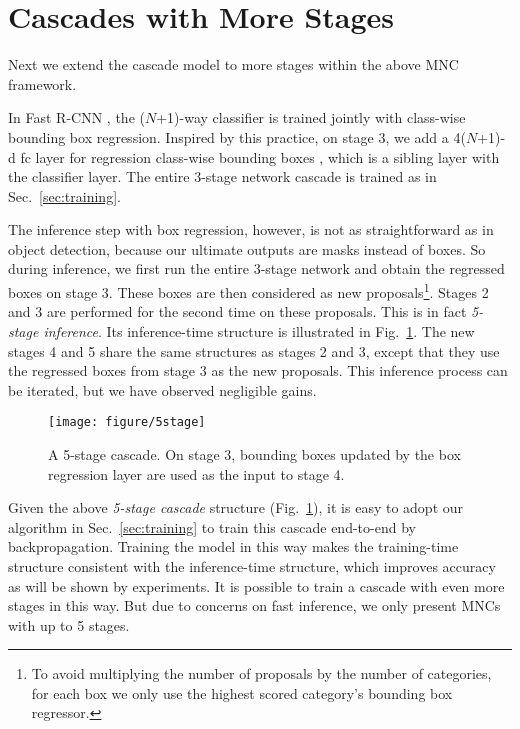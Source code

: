 \documentclass[10pt,twocolumn,letterpaper]{article}
\begin{document}
\section{Cascades with More Stages}
\label{sec:morestages}

Next we extend the cascade model to more stages within the above MNC framework.

In Fast R-CNN \cite{Girshick2015}, the ($N$+1)-way classifier is trained jointly with class-wise bounding box regression. Inspired by this practice, on stage 3, we add a 4($N$+1)-d fc layer for regression class-wise bounding boxes \cite{Girshick2015}, which is a sibling layer with the classifier layer. The entire 3-stage network cascade is trained as in Sec.~\ref{sec:training}.

The inference step with box regression, however, is not as straightforward as in object detection, because our ultimate outputs are masks instead of boxes. So during inference, we first run the entire 3-stage network and obtain the regressed boxes on stage 3. These boxes are then considered as new proposals\footnote{To avoid multiplying the number of proposals by the number of categories, for each box we only use the highest scored category's bounding box regressor.}.
Stages 2 and 3 are performed for the second time on these proposals.
This is in fact \emph{5-stage inference}. Its inference-time structure is illustrated in Fig.~\ref{fig:5stage}. The new stages 4 and 5 share the same structures as stages 2 and 3, except that they use the regressed boxes from stage 3 as the new proposals. This inference process can be iterated, but we have observed negligible gains.

\begin{figure}
\begin{center}
\texttt{[image: figure/5stage]}
\end{center}
\vspace{-1em}
\caption{A 5-stage cascade. On stage 3, bounding boxes updated by the box regression layer are used as the input to stage 4.}
\label{fig:5stage}
\end{figure}

Given the above \emph{5-stage cascade} structure (Fig.~\ref{fig:5stage}), it is easy to adopt our algorithm in Sec.~\ref{sec:training} to train this cascade end-to-end by backpropagation. Training the model in this way makes the training-time structure consistent with the inference-time structure, which improves accuracy as will be shown by experiments.
It is possible to train a cascade with even more stages in this way. But due to concerns on fast inference, we only present MNCs with up to 5 stages.
\end{document}
